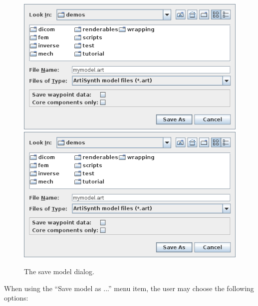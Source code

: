 \documentclass{article}
\begin{document}
\begin{figure}[h]
\begin{center}
\iflatexml
\includegraphics[]{images/saveModelDialog}
\else
\includegraphics[width=.7\textwidth]{images/saveModelDialog}
\fi
\end{center}
\caption{The save model dialog.}%
\label{saveModelDialog:fig}
\end{figure}

When using the {\sf ``Save model as ...''} menu item, the user may choose
the following options:
\end{document}
